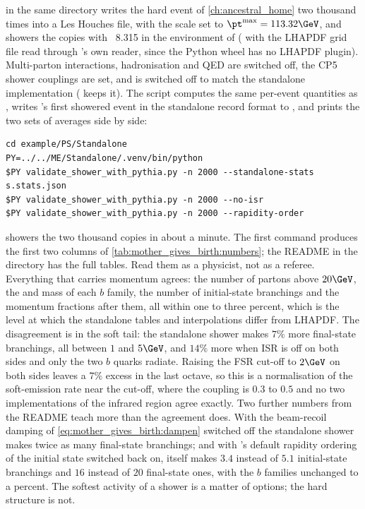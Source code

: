  in the same directory writes the hard
event of \cref{ch:ancestral_home} two thousand times into a Les Houches
file, with the scale  set to $\pt^{\max}=113.32\GeV$, and
showers the copies with \PYTHIA~8.315 in the environment of
 ( with the LHAPDF grid file
read through \PYTHIA's own  reader, since the Python wheel
has no LHAPDF plugin). Multi-parton interactions, hadronisation and QED are
switched off, the CP5 shower couplings are set, and
 is switched off to match the standalone
implementation ( keeps it). The script computes the
same per-event quantities as , writes \PYTHIA's first
showered event in the standalone record format to
, and prints the two sets of
averages side by side:
\begin{verbatim}
cd example/PS/Standalone
PY=../../ME/Standalone/.venv/bin/python
$PY validate_shower_with_pythia.py -n 2000 --standalone-stats s.stats.json
$PY validate_shower_with_pythia.py -n 2000 --no-isr
$PY validate_shower_with_pythia.py -n 2000 --rapidity-order
\end{verbatim}
\PYTHIA showers the two thousand copies in about a minute. The first
command produces the first two columns of
\cref{tab:mother_gives_birth:numbers}; the README in the directory has the
full tables. Read them as a physicist, not as a referee. Everything that
carries momentum agrees: the number of partons above $20\GeV$, the \pt and
mass of each $b$ family, the number of initial-state branchings and the
momentum fractions after them, all within one to three percent, which is
the level at which the standalone tables and interpolations differ from
LHAPDF. The disagreement is in the soft tail: the standalone shower makes
$7\%$ more final-state branchings, all between $1$ and $5\GeV$, and $14\%$
more when ISR is off on both sides and only the two $b$ quarks radiate.
Raising the FSR cut-off to $2\GeV$ on both sides leaves a $7\%$ excess in
the last octave, so this is a normalisation of the soft-emission rate near
the cut-off, where the coupling is $0.3$ to $0.5$ and no two implementations
of the infrared region agree exactly. Two further numbers from the README
teach more than the agreement does. With the beam-recoil damping of
\cref{eq:mother_gives_birth:dampen} switched off the standalone shower
makes twice as many final-state branchings; and with \PYTHIA's default
rapidity ordering of the initial state switched back on, \PYTHIA itself
makes $3.4$ instead of $5.1$ initial-state branchings and $16$ instead of
$20$ final-state ones, with the $b$ families unchanged to a percent. The
softest activity of a shower is a matter of options; the hard structure is
not.

